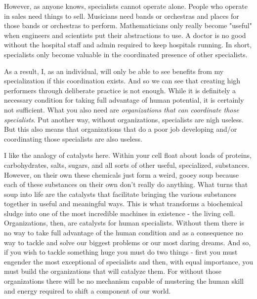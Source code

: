 \documentclass[11pt,a5paper]{book}
\begin{document}
However, as anyone knows, specialists cannot operate alone. People who operate in sales need things to sell. Musicians need bands or orchestras and places for those bands or orchestras to perform. Mathematicians only really become "useful" when engineers and scientists put their abstractions to use. A doctor is no good without the hospital staff and admin required to keep hospitals running. In short, specialists only become valuable in the coordinated presence of other specialists.
\newline

As a result, I, as an individual, will only be able to see benefits from my specialization if this coordination exists. And so we can see that creating high performers through deliberate practice is not enough. While it is definitely a necessary condition for taking full advantage of human potential, it is certainly not sufficient. What you also need are \textit{organizations that can coordinate those specialists}. Put another way, without organizations, specialists are nigh useless. But this also means that organizations that do a poor job developing and/or coordinating those specialists are also useless. 
\newline 

I like the analogy of catalysts here. Within your cell float about loads of proteins, carbohydrates, salts, sugars, and all sorts of other useful, specialized, substances. However, on their own these chemicals just form a weird, gooey soup because each of these substances on their own don't really do anything. What turns that soup into life are the catalysts that facilitate bringing the various substances together in useful and meaningful ways. This is what transforms a biochemical sludge into one of the most incredible machines in existence - the living cell. Organizations, then, are catalysts for human specialists. Without them there is no way to take full advantage of the human condition and as a consequence no way to tackle and solve our biggest problems or our most daring dreams. And so, if you wish to tackle something huge you must do two things - first you must engender the most exceptional of specialists and then, with equal importance, you must build the organizations that will catalyze them. For without those organizations there will be no mechanism capable of mustering the human skill and energy required to shift a component of our world.

\nocite{duckworth} \nocite{outliers}
\end{document}
